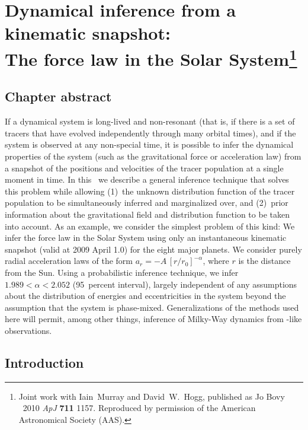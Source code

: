 
\chapter[Dynamical inference from a kinematic snapshot: The force law in the Solar System]{Dynamical inference from a kinematic snapshot:\\
  The force law in the Solar System\protect\footnote{Joint work with
  Iain~Murray and David~W.~Hogg, published as Jo Bovy \etal\
  2010 \emph{ApJ} {\bf 711} 1157. Reproduced by permission of the
  American Astronomical Society (AAS).}\label{chap:solarsystem}}

\section{Chapter abstract}
If a dynamical system is long-lived and non-resonant (that is, if
there is a set of tracers that have evolved independently through many
orbital times), and if the system is observed at any non-special time,
it is possible to infer the dynamical properties of the system (such
as the gravitational force or acceleration law) from a snapshot of the
positions and velocities of the tracer population at a single moment
in time. In this \chaptername\ we describe a general inference
technique that solves this problem while allowing (1)~the unknown
distribution function of the tracer population to be simultaneously
inferred and marginalized over, and (2)~prior information about the
gravitational field and distribution function to be taken into
account. As an example, we consider the simplest problem of this kind:
We infer the force law in the Solar System using only an instantaneous
kinematic snapshot (valid at 2009 April 1.0) for the eight major
planets. We consider purely radial acceleration laws of the form $a_r=
-A\,[r/r_0]^{-\alpha}$, where $r$ is the distance from the Sun.  Using
a probabilistic inference technique, we infer $1.989<\alpha<2.052$
(95~percent interval), largely independent of any assumptions about
the distribution of energies and eccentricities in the system beyond
the assumption that the system is phase-mixed. Generalizations of the
methods used here will permit, among other things, inference of
Milky-Way dynamics from \Gaia-like observations.

\section{Introduction}

